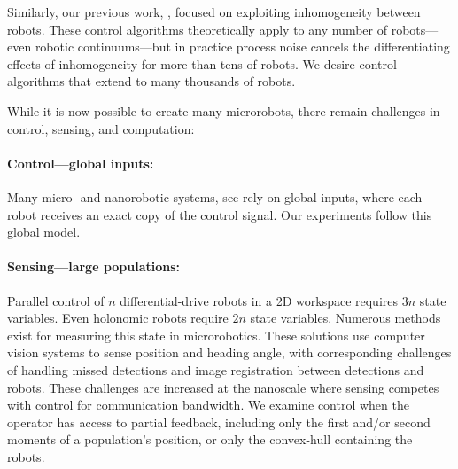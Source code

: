 Similarly, our previous work, \cite{Becker2012,Becker2012k}, focused on exploiting inhomogeneity between robots.  These control algorithms theoretically apply to any number of robots---even robotic continuums---but in practice process noise cancels the differentiating effects of inhomogeneity for more than tens of robots.  We desire control algorithms that extend to many thousands of robots.

 While it is now possible to create many microrobots, there remain challenges in control, sensing, and computation:
  
 \paragraph{Control---global inputs:}
 Many micro- and nanorobotic systems, see \cite{Tottori2012,Shirai2005,Chiang2011,Donald2006,Donald2008,Takahashi2006,Floyd2011,Diller2013,Frutiger2008,Peyer2013}
   rely on global inputs, where each robot receives an exact copy of the control signal.  Our experiments follow this global model.
  
 \paragraph{Sensing---large populations:}
 Parallel control of $n$ differential-drive robots in a 2D workspace requires $3n$ state variables. Even holonomic robots require $2n$ state variables. Numerous methods exist for measuring this state in microrobotics.  These solutions use computer vision systems to sense position and heading angle, with corresponding challenges of handling missed detections and image registration between detections and robots.  These challenges are increased at the nanoscale where sensing competes with control for communication bandwidth.   We examine control when the operator has access to partial feedback, including only the first and/or second moments of a population's position, or only the convex-hull containing the robots.
 
